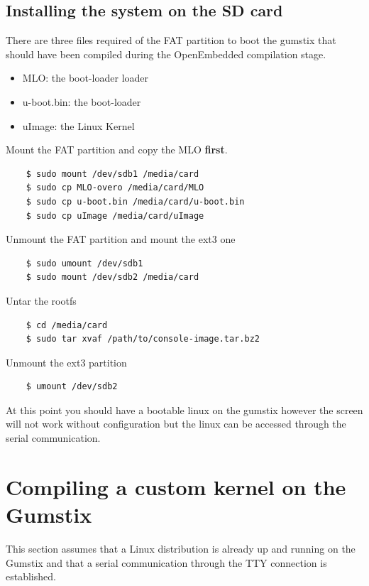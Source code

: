 \documentclass[11pt]{report} %
\begin{document}
	\subsection{Installing the system on the SD card}
		There are three files required of the FAT partition to boot the gumstix
		that should have been compiled during the OpenEmbedded compilation
		stage.
		\begin{itemize}
			\item MLO: the boot-loader loader
			\item u-boot.bin: the boot-loader
			\item uImage: the Linux Kernel
		\end{itemize}

		Mount the FAT partition and copy the MLO {\bf first}.
\begin{lstlisting}
	$ sudo mount /dev/sdb1 /media/card
	$ sudo cp MLO-overo /media/card/MLO
	$ sudo cp u-boot.bin /media/card/u-boot.bin
	$ sudo cp uImage /media/card/uImage
\end{lstlisting}

		Unmount the FAT partition and mount the ext3 one
\begin{lstlisting}
	$ sudo umount /dev/sdb1
	$ sudo mount /dev/sdb2 /media/card
\end{lstlisting}

		Untar the rootfs
\begin{lstlisting}
	$ cd /media/card
	$ sudo tar xvaf /path/to/console-image.tar.bz2
\end{lstlisting}

		Unmount the ext3 partition
\begin{lstlisting}
	$ umount /dev/sdb2
\end{lstlisting}

		At this point you should have a bootable linux on the gumstix however
		the screen will not work without configuration but the linux can be
		accessed through the serial communication.

	\section{Compiling a custom kernel on the Gumstix}
		This section assumes that a Linux distribution is already up and
		running on the Gumstix and that a serial communication through the TTY
		connection is established.
\end{document}
